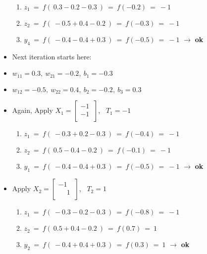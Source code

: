 \documentclass[12pt]{article}
\begin{document}
\begin{itemize}
	{	
		\begin{enumerate}
			\item $z_1 \ = \ f(\ 0.3 -  0.2 - 0.3 \ ) \ = \ f(-0.2) \ = \ -1$
			\item $z_2 \ = \ f(\ -0.5 + 0.4 - 0.2 \ ) \ = \ f(-0.3) \ = \ -1$
			\item $y_4 \ = \ f (\ -0.4 - 0.4 + 0.3 \ )\ = \ f(-0.5)  \ = \ -1$ $\rightarrow$ \textbf{ok}
			
		\end{enumerate}
		
	}

	\item Next iteration starts here:
	
	\item $w_{11} = 0.3,\ w_{21} = -0.2,\ b_1 = -0.3$
	\item $w_{12} = -0.5,\ w_{22} = 0.4,\ b_2 = -0.2,\  b_3 = 0.3 $
	
	\item Again, Apply $X_1 = \begin{bmatrix}
		-1\ \\ 	
		-1\ \\ 	
	\end{bmatrix}$, \  $T_1 = -1$
	
	{	
		\begin{enumerate}
			\item $z_1 \ = \ f(\ -0.3  +  0.2 - 0.3 \ ) \ = \ f(-0.4) \ = \ -1$
			\item $z_2 \ = \ f(\ 0.5 -  0.4 - 0.2 \ ) \ = \ f(-0.1) \ = \ -1$
			\item $y_1 \ = \ f (\ -0.4 - 0.4 + 0.3 \ )\ = \ f(-0.5)  \ = \ -1$ $\rightarrow$ \textbf{ok}
		\end{enumerate}
		
	}

	
	\item Apply $X_2 = \begin{bmatrix}
		-1\ \\ 	
		\phantom{-}1\ \\ 	
	\end{bmatrix}$, \  $T_2 = 1$
	
	{	
		\begin{enumerate}
			\item $z_1 \ = \ f(\ -0.3  -  0.2 - 0.3 \ ) \ = \ f(-0.8) \ = \ -1$
			\item $z_2 \ = \ f(\ 0.5 + 0.4 - 0.2 \ ) \ = \ f(0.7) \ = \ 1$
			\item $y_2 \ = \ f (\ -0.4 + 0.4 + 0.3 \ )\ = \ f(0.3)  \ = \ 1$ $\rightarrow$ \textbf{ok}
		\end{enumerate}
		
}
\end{itemize}
\end{document}
